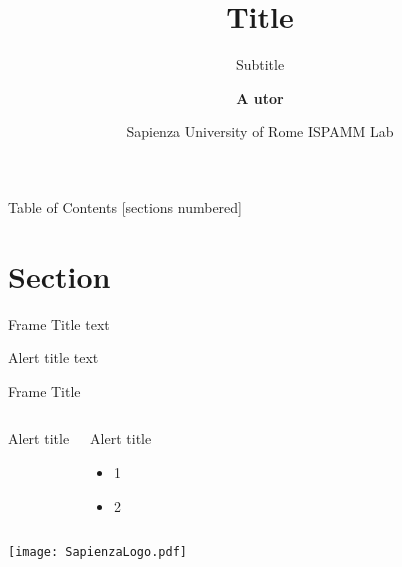 \documentclass[10pt,aspectratio=43]{beamer}
\title[Title]{Title}
\subtitle{\textcolor{courage}{Subtitle}}
\author[A.utor]{\textcolor{charcoal}{\textbf{A utor}}}
\date[uniroma1]{\textcolor{charcoal}{Sapienza University of Rome \newline ISPAMM Lab}}
\institute{
\vspace{10mm}
\hspace{60mm}
\texttt{[image: SapienzaLogo.pdf]}
\hspace{10mm}
\texttt{[image: logo\_ispamm.pdf]}}
\begin{document}
	
	\maketitle
    
	\begin{frame}{Table of Contents}
		[sections numbered]
		\tableofcontents[hideallsubsections]
	\end{frame}
    
	\section{Section}
    
	\begin{frame}{Frame Title}
	    text
		\begin{alertblock}{Alert title}
    		text
		\end{alertblock}
	\end{frame}
    
	\begin{frame}{Frame Title}
	
		\begin{columns}[T]
	        \begin{exampleblock}{Alert title}
		    \end{exampleblock}
			
			\begin{alertblock}{Alert title}
				\begin{itemize}
					\item<+->1
					\item<+-> 2
				\end{itemize}
			\end{alertblock}
		\end{columns}
	\end{frame}

	\appendix
	

	\begin{frame}[standout]
	    \vspace{10mm}
		\texttt{[image: SapienzaLogo.pdf]}
	\end{frame}
\end{document}
